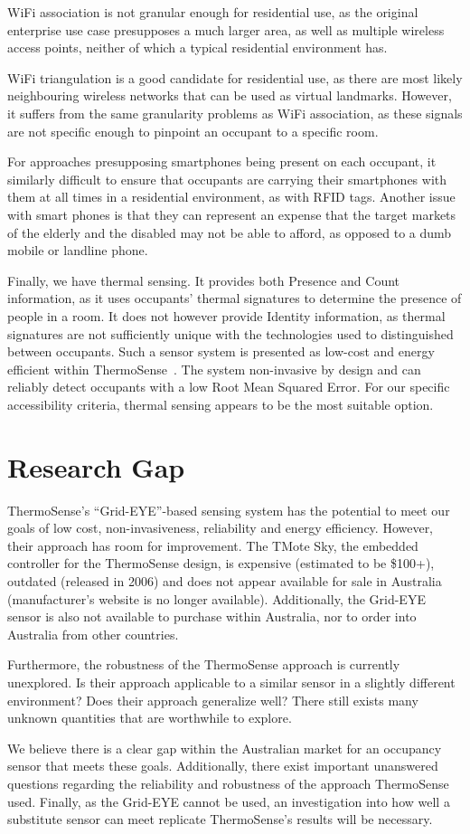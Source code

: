 \documentclass[../thesis/thesis.tex]{subfiles}
\begin{document}
WiFi association is not granular enough for residential use, as the original enterprise use case presupposes a much larger area, as well as multiple wireless access points, neither of which a typical residential environment has.

WiFi triangulation is a good candidate for residential use, as there are most likely neighbouring wireless networks that can be used as virtual landmarks. However, it suffers from the same granularity problems as WiFi association, as these signals are not specific enough to pinpoint an occupant to a specific room.

For approaches presupposing smartphones being present on each occupant, it similarly difficult to ensure that occupants are carrying their smartphones with them at all times in a residential environment, as with RFID tags.  Another issue with smart phones is that they can represent an expense that the target markets of the elderly and the disabled may not be able to afford, as opposed to a dumb mobile or landline phone.

Finally, we have thermal sensing. It provides both Presence and Count information, as it uses occupants' thermal signatures to determine the presence of people in a room. It does not however provide Identity information, as thermal signatures are not sufficiently unique with the technologies used to distinguished between occupants. Such a sensor system is presented as low-cost and energy efficient within ThermoSense~\cite{beltran2013thermosense}. The system non-invasive by design and can reliably detect occupants with a low Root Mean Squared Error. For our specific accessibility criteria, thermal sensing appears to be the most suitable option.

\section{Research Gap}
ThermoSense's ``Grid-EYE''-based sensing system has the potential to meet our goals of low cost, non-invasiveness, reliability and energy efficiency. However, their approach has room for improvement. The TMote Sky, the embedded controller for the ThermoSense design, is expensive (estimated to be \$100+), outdated (released in 2006) and does not appear available for sale in Australia (manufacturer's website is no longer available). Additionally, the Grid-EYE sensor is also not available to purchase within Australia, nor to order into Australia from other countries.

Furthermore, the robustness of the ThermoSense approach is currently unexplored. Is their approach applicable to a similar sensor in a slightly different environment? Does their approach generalize well? There still exists many unknown quantities that are worthwhile to explore.

We believe there is a clear gap within the Australian market for an occupancy sensor that meets these goals. Additionally, there exist important unanswered questions regarding the reliability and robustness of the approach ThermoSense used. Finally, as the Grid-EYE cannot be used, an investigation into how well a substitute sensor can meet replicate ThermoSense's results will be necessary.

\end{document}
